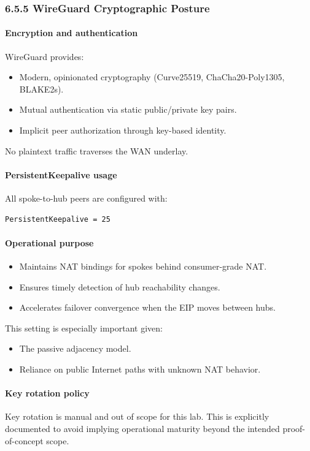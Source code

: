 \documentclass[11pt]{article}
\begin{document}
\subsubsection{6.5.5 WireGuard Cryptographic Posture}

\paragraph{Encryption and authentication}
WireGuard provides:
\begin{itemize}
  \item Modern, opinionated cryptography (Curve25519, ChaCha20-Poly1305, BLAKE2s).
  \item Mutual authentication via static public/private key pairs.
  \item Implicit peer authorization through key-based identity.
\end{itemize}

No plaintext traffic traverses the WAN underlay.

\paragraph{PersistentKeepalive usage}
All spoke-to-hub peers are configured with:

\begin{verbatim}
PersistentKeepalive = 25
\end{verbatim}

\paragraph{Operational purpose}
\begin{itemize}
  \item Maintains NAT bindings for spokes behind consumer-grade NAT.
  \item Ensures timely detection of hub reachability changes.
  \item Accelerates failover convergence when the EIP moves between hubs.
\end{itemize}

This setting is especially important given:
\begin{itemize}
  \item The passive adjacency model.
  \item Reliance on public Internet paths with unknown NAT behavior.
\end{itemize}

\paragraph{Key rotation policy}
Key rotation is manual and out of scope for this lab. This is explicitly documented to avoid implying operational maturity beyond the intended proof-of-concept scope.
\end{document}
